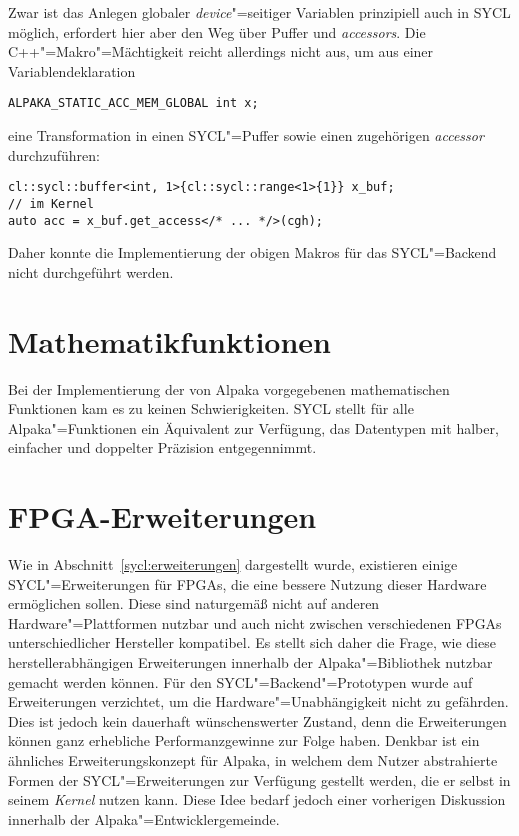 Zwar ist das Anlegen globaler \textit{device}"=seitiger Variablen prinzipiell
auch in SYCL möglich, erfordert hier aber den Weg über Puffer und
\textit{accessors}. Die C++"=Makro"=Mächtigkeit reicht allerdings nicht aus, um
aus einer Variablendeklaration

\begin{code}
    \begin{verbatim}
ALPAKA_STATIC_ACC_MEM_GLOBAL int x;
    \end{verbatim}
\end{code}

eine Transformation in einen SYCL"=Puffer sowie einen zugehörigen
\textit{accessor} durchzuführen:

\begin{code}
    \begin{verbatim}
cl::sycl::buffer<int, 1>{cl::sycl::range<1>{1}} x_buf;
// im Kernel
auto acc = x_buf.get_access</* ... */>(cgh);
    \end{verbatim}
\end{code}

Daher konnte die Implementierung der obigen Makros für das SYCL"=Backend nicht
durchgeführt werden.

\section{Mathematikfunktionen}

Bei der Implementierung der von Alpaka vorgegebenen mathematischen Funktionen
kam es zu keinen Schwierigkeiten. SYCL stellt für alle Alpaka"=Funktionen ein
Äquivalent zur Verfügung, das Datentypen mit halber, einfacher und doppelter
Präzision entgegennimmt. \cite[vgl.][230--234]{sycl2019}

\section{FPGA-Erweiterungen}\label{implementierung:probleme:fpga}

Wie in Abschnitt~\ref{sycl:erweiterungen} dargestellt wurde, existieren einige
SYCL"=Erweiterungen für FPGAs, die eine bessere Nutzung dieser Hardware
ermöglichen sollen. Diese sind naturgemäß nicht auf anderen
Hardware"=Plattformen nutzbar und auch nicht zwischen verschiedenen
FPGAs unterschiedlicher Hersteller kompatibel. Es stellt sich daher die Frage,
wie diese herstellerabhängigen Erweiterungen innerhalb der Alpaka"=Bibliothek
nutzbar gemacht werden können. Für den SYCL"=Backend"=Prototypen wurde auf
Erweiterungen verzichtet, um die Hardware"=Unabhängigkeit nicht zu gefährden.
Dies ist jedoch kein dauerhaft wünschenswerter Zustand, denn die Erweiterungen
können ganz erhebliche Performanzgewinne zur Folge haben. Denkbar ist ein
ähnliches Erweiterungskonzept für Alpaka, in welchem dem Nutzer abstrahierte
Formen der SYCL"=Erweiterungen zur Verfügung gestellt werden, die er selbst in
seinem \textit{Kernel} nutzen kann. Diese Idee bedarf jedoch einer vorherigen Diskussion
innerhalb der Alpaka"=Entwicklergemeinde.

